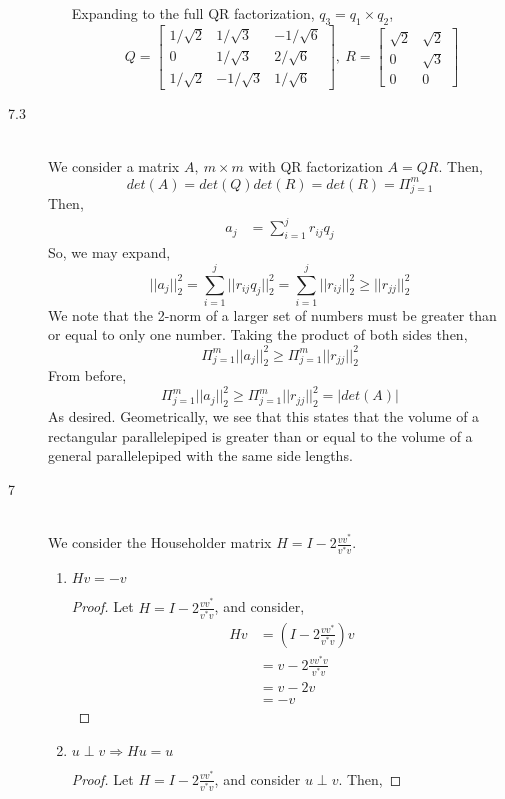 \documentclass[letterpaper,10pt]{article}
\begin{document}
\begin{description}
\begin{enumerate}
Expanding to the full QR factorization,
$q_3=q_1\times q_2$,
\[Q=\begin{bmatrix}
1/\sqrt{2} & 1/\sqrt{3} & -1/\sqrt{6}\\
0 & 1/\sqrt{3} & 2/\sqrt{6}\\
1/\sqrt{2} & -1/\sqrt{3} & 1/\sqrt{6}
\end{bmatrix},\ R=\begin{bmatrix}
\sqrt{2} & \sqrt{2}\\
0 & \sqrt{3}\\
0 & 0
\end{bmatrix} \]
\end{enumerate}
\item[7.3]\hfill \\
We consider a matrix $A,\ m\times m$ with QR factorization $A=QR$. Then,
\[det(A)=det(Q)det(R)=det(R)=\Pi_{j=1}^m\]
Then,
\begin{align*}
a_j &= \sum_{i=1}^jr_{ij}q_j
\end{align*}
So, we may expand,
\[||a_j||^2_2=\sum_{i=1}^j||r_{ij}q_j||^2_2=\sum_{i=1}^j||r_{ij}||^2_2\geq ||r_{jj}||^2_2\]
We note that the 2-norm of a larger set of numbers must be greater than or equal to only one number. Taking the product of both sides then,
\[\Pi_{j=1}^m||a_j||^2_2\geq \Pi_{j=1}^m||r_{jj}||^2_2\]
From before,
\[\Pi_{j=1}^m||a_j||^2_2\geq \Pi_{j=1}^m||r_{jj}||^2_2=|det(A)|\]
As desired. Geometrically, we see that this states that the volume of a rectangular parallelepiped is greater than or equal to the volume of a general parallelepiped with the same side lengths.
\item[7]\hfill\\
We consider the Householder matrix $H=I-2\frac{vv^*}{v^*v}$.
\begin{enumerate}[label=\alph*.]
\item $Hv=-v$\\
\begin{proof}
Let $H=I-2\frac{vv^*}{v^*v}$, and consider,
\begin{align*}
Hv &= (I-2\frac{vv^*}{v^*v})v\\
&= v-2\frac{vv^*v}{v^*v}\\
&= v-2v\\
&= -v
\end{align*}
\end{proof}
\item $u\perp v\Rightarrow Hu=u$\\
\begin{proof}
Let $H=I-2\frac{vv^*}{v^*v}$, and consider $u\perp v$. Then,

\end{proof}
\end{enumerate}
\end{description}
\end{document}
